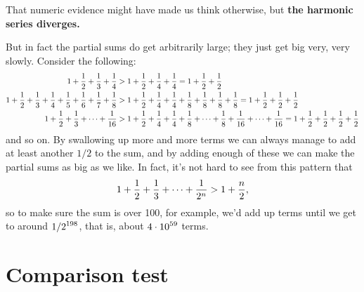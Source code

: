 That numeric evidence might have made us think otherwise, but
\textbf{the harmonic series diverges.}

But in fact the partial sums do get arbitrarily large; they just get
big very, very slowly. Consider the following:
\begin{align*}
\displaystyle 1+{1\over 2}+{1\over 3}+{1\over 4} &> 
1+{1\over 2}+{1\over 4}+{1\over
  4} = 1+{1\over 2}+{1\over 2} \\
\displaystyle 1+{1\over 2}+{1\over 3}+{1\over 4}+
{1\over 5}+{1\over 6}+{1\over
    7}+{1\over 8} &> 
1+{1\over 2}+{1\over 4}+{1\over 4}+{1\over 8}+{1\over 8}+{1\over
    8}+{1\over 8} = 1+{1\over 2}+{1\over 2}+{1\over 2} \\
\displaystyle 1+{1\over 2}+{1\over 3}+\cdots+{1\over16} &> 
1+{1\over 2}+{1\over 4}+{1\over 4}+{1\over 8}+\cdots+{1\over
  8}+{1\over16}+\cdots +{1\over16} =1+{1\over 2}+{1\over 2}+{1\over
  2}+{1\over 2} 
\end{align*}
\noindent
and so on. By swallowing up more and more terms we can always manage
to add at least another $1/2$ to the sum, and by adding enough of
these we can make the partial sums as big as we like. In fact, it's
not hard to see from this pattern that
$$1+{1\over 2}+{1\over 3}+\cdots+{1\over 2^n} > 1+{n\over 2},$$
so to make sure the sum is over 100, for example, we'd add
up terms until we get to around $\displaystyle 1/2^{198}$, that is,
about $\displaystyle 4\cdot 10^{59}$ terms.



\section{Comparison test}
\label{section:comparison-test}



